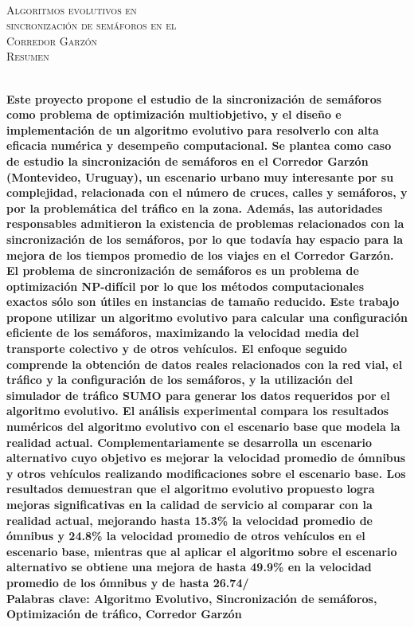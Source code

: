 {
\thispagestyle{empty}
~\\[0.2cm]
\begin{center}
    \textsc{\huge Algoritmos evolutivos en  } \\[0.2cm] 
    \textsc{\huge sincronización de semáforos en el  } \\[0.2cm]         
    \textsc{\huge Corredor Garzón} \\[1cm]
    \textsc{\Large Resumen}
\end{center}
~\\[0.2cm]
\textbf{\large 
Este proyecto propone el estudio de la sincronización de semáforos como problema de optimización multiobjetivo, y el diseño e implementación de un algoritmo evolutivo para resolverlo con alta eficacia numérica y desempeño computacional. Se plantea como caso de estudio la sincronización de semáforos en el Corredor Garzón (Montevideo, Uruguay), un escenario urbano muy interesante por su complejidad, relacionada con el número de cruces, calles y semáforos, y por la problemática del tráfico en la zona. Además, las autoridades responsables admitieron la existencia de problemas relacionados con la sincronización de los semáforos, por lo que todavía hay espacio para la mejora de los tiempos promedio de los viajes en el Corredor Garzón.  \newline \newline
El problema de sincronización de semáforos es un problema de optimización NP-difícil por lo que los métodos computacionales exactos sólo son útiles en instancias de tamaño reducido. Este trabajo propone utilizar un algoritmo evolutivo para calcular una configuración eficiente de los semáforos, maximizando la velocidad media del transporte colectivo y de otros vehículos.
El enfoque seguido comprende la obtención de datos reales relacionados con la red vial, el tráfico y la configuración de los semáforos, y la utilización del simulador de tráfico SUMO para generar los datos requeridos por el algoritmo evolutivo.
\newline \newline
El análisis experimental compara los resultados numéricos del algoritmo evolutivo con el escenario base que modela la realidad actual. Complementariamente se desarrolla un escenario alternativo cuyo objetivo es mejorar la velocidad promedio de ómnibus y otros vehículos realizando modificaciones sobre el escenario base. Los resultados demuestran que el algoritmo evolutivo propuesto logra mejoras significativas en la calidad de servicio al comparar con la realidad actual, mejorando hasta 15.3\% la velocidad promedio de ómnibus y 24.8\% la velocidad promedio de otros vehículos en el escenario base, mientras que al aplicar el algoritmo sobre el escenario alternativo se obtiene una mejora de hasta 49.9\% en la velocidad promedio de los ómnibus y de hasta 26.74/%
 } 	
	~\\[1.0cm]
    \textbf{\large Palabras clave: Algoritmo Evolutivo, Sincronización de semáforos, Optimización de tráfico, Corredor Garzón}

}
\cleardoublepage
